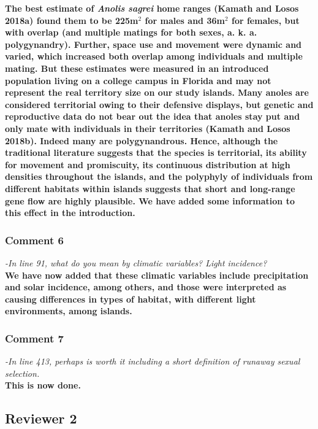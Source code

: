 \documentclass{article}
\begin{document}
	\textbf{The best estimate of \textit{Anolis sagrei} home ranges (Kamath and Losos 2018a) found them to be 225m$^2$ for males and 36m$^2$ for females, but with overlap (and multiple matings for both sexes, a. k. a. polygynandry). Further, space use and movement were dynamic and varied, which increased both overlap among individuals and multiple mating. But these estimates were measured in an introduced population living on a college campus in Florida and may not represent the real territory size on our study islands. 
	Many anoles are considered territorial owing to their defensive displays, but genetic and reproductive data do not bear out the idea that anoles stay put and only mate with individuals in their territories (Kamath and Losos 2018b). Indeed many are polygynandrous. Hence, although the traditional literature suggests that the species is territorial, its ability for movement and promiscuity, its continuous distribution at high densities throughout the islands, and the polyphyly of individuals from different habitats within islands suggests that short and long-range gene flow are highly plausible. We have added some information to this effect in the introduction.}

	\subsubsection*{Comment 6}
	
	\textit{-In line 91, what do you mean by climatic variables? Light incidence?}\\
	
	\textbf{We have now added that these climatic variables include precipitation and solar incidence, among others, and those were interpreted as causing differences in types of habitat, with different light environments, among islands.}
	
	\subsubsection*{Comment 7}
	
	\textit{-In line 413, perhaps is worth it including a short definition of runaway sexual selection.}\\
	
	\textbf{This is now done.}
	
	\pagebreak
	
	\subsection*{Reviewer 2}
	
\end{document}
